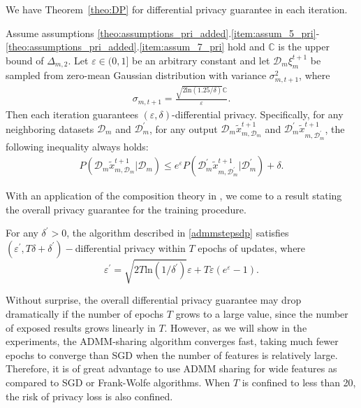 We have Theorem~\ref{theo:DP} for differential privacy guarantee in each iteration.
\begin{theorem}\label{theo:DP}
  Assume assumptions \ref{theo:assumptions_pri_added}.\ref{item:assum_5_pri}-\ref{theo:assumptions_pri_added}.\ref{item:assum_7_pri} hold and $\mathbb{C}$ is the 
  upper bound of $\Delta_{m,2}$. Let $\varepsilon\in(0,1]$ be an arbitrary constant and let
  $\mathcal{D}_m\xi_m^{t+1}$ be sampled from zero-mean Gaussian distribution with variance $\sigma_{m,t+1}^2$,
  where
  \begin{eqnarray*}
    \sigma_{m,t+1}=\frac{\sqrt{2\text{ln}(1.25/\delta)}\mathbb{C}}{\varepsilon}.
  \end{eqnarray*}
  Then each iteration guarantees $(\varepsilon,\delta)$-differential privacy. Specifically,
  for any neighboring datasets $\mathcal{D}_m$ and $\mathcal{D}_m^{\prime}$, for any output
  $\mathcal{D}_m\tilde{x}_{m,\mathcal{D}_m}^{t+1}$ and $\mathcal{D}_m^{\prime}\tilde{x}_{m,\mathcal{D}_m^{\prime}}^{t+1}$, the following inequality always holds:
  \begin{eqnarray*}
    P(\mathcal{D}_m\tilde{x}_{m,\mathcal{D}_m}^{t+1}|\mathcal{D}_m)\leq e^{\varepsilon}
    P(\mathcal{D}_m^{\prime}\tilde{x}_{m,\mathcal{D}_m^{\prime}}^{t+1}|\mathcal{D}_m^{\prime})
    +\delta.
  \end{eqnarray*}
\end{theorem}

With an application of the composition theory in \cite{dwork2014algorithmic}, we come to a result stating the overall privacy guarantee for the training procedure.
\begin{coro}\label{theorem:overall_privacy}
  For any $\delta^{\prime}>0$, the algorithm described in \eqref{admmstepsdp} satisfies $(\varepsilon^{\prime}, T\delta+\delta^{\prime})-$differential privacy within $T$ epochs of updates, where
  \begin{equation}
    \varepsilon^{\prime}=\sqrt{2T\text{ln}(1/\delta^{\prime})}\varepsilon+T\varepsilon(e^\varepsilon - 1).
  \end{equation}
\end{coro}

Without surprise, the overall differential privacy guarantee may drop dramatically if the number of epochs $T$ grows to a large value, since the number of exposed results grows linearly in $T$. However, as we will show in the experiments, the ADMM-sharing algorithm converges fast, taking much fewer epochs to converge than SGD when the number of features is relatively large. Therefore, it is of great advantage to use ADMM sharing for wide features as compared to SGD or Frank-Wolfe algorithms. When $T$ is confined to less than 20, the risk of privacy loss is also confined.
